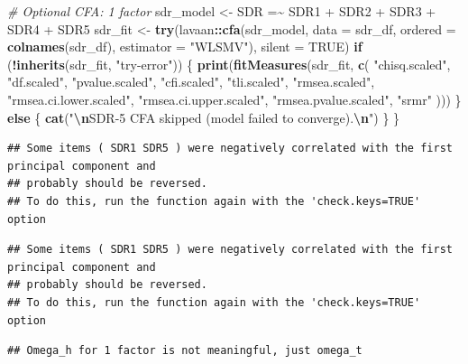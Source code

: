 \documentclass[
  10pt,
]{article}
\newenvironment{Shaded}{\begin{snugshade}}{\end{snugshade}}
\newcommand{\AttributeTok}[1]{\textcolor[rgb]{0.13,0.29,0.53}{#1}}
\newcommand{\CommentTok}[1]{\textcolor[rgb]{0.56,0.35,0.01}{\textit{#1}}}
\newcommand{\ConstantTok}[1]{\textcolor[rgb]{0.56,0.35,0.01}{#1}}
\newcommand{\ControlFlowTok}[1]{\textcolor[rgb]{0.13,0.29,0.53}{\textbf{#1}}}
\newcommand{\FunctionTok}[1]{\textcolor[rgb]{0.13,0.29,0.53}{\textbf{#1}}}
\newcommand{\NormalTok}[1]{#1}
\newcommand{\OtherTok}[1]{\textcolor[rgb]{0.56,0.35,0.01}{#1}}
\newcommand{\SpecialCharTok}[1]{\textcolor[rgb]{0.81,0.36,0.00}{\textbf{#1}}}
\newcommand{\StringTok}[1]{\textcolor[rgb]{0.31,0.60,0.02}{#1}}
\begin{document}
\begin{Shaded}
\begin{Highlighting}[]
  \CommentTok{\# Optional CFA: 1 factor}
\NormalTok{  sdr\_model }\OtherTok{\textless{}{-}} \StringTok{\textquotesingle{}SDR =\textasciitilde{} SDR1 + SDR2 + SDR3 + SDR4 + SDR5\textquotesingle{}}
\NormalTok{  sdr\_fit }\OtherTok{\textless{}{-}} \FunctionTok{try}\NormalTok{(lavaan}\SpecialCharTok{::}\FunctionTok{cfa}\NormalTok{(sdr\_model, }\AttributeTok{data =}\NormalTok{ sdr\_df, }\AttributeTok{ordered =} \FunctionTok{colnames}\NormalTok{(sdr\_df), }\AttributeTok{estimator =} \StringTok{"WLSMV"}\NormalTok{), }\AttributeTok{silent =} \ConstantTok{TRUE}\NormalTok{)}
  \ControlFlowTok{if}\NormalTok{ (}\SpecialCharTok{!}\FunctionTok{inherits}\NormalTok{(sdr\_fit, }\StringTok{"try{-}error"}\NormalTok{)) \{}
    \FunctionTok{print}\NormalTok{(}\FunctionTok{fitMeasures}\NormalTok{(sdr\_fit, }\FunctionTok{c}\NormalTok{(}
      \StringTok{"chisq.scaled"}\NormalTok{, }\StringTok{"df.scaled"}\NormalTok{, }\StringTok{"pvalue.scaled"}\NormalTok{, }\StringTok{"cfi.scaled"}\NormalTok{,}
      \StringTok{"tli.scaled"}\NormalTok{, }\StringTok{"rmsea.scaled"}\NormalTok{, }\StringTok{"rmsea.ci.lower.scaled"}\NormalTok{,}
      \StringTok{"rmsea.ci.upper.scaled"}\NormalTok{, }\StringTok{"rmsea.pvalue.scaled"}\NormalTok{, }\StringTok{"srmr"}
\NormalTok{    )))}
\NormalTok{  \} }\ControlFlowTok{else}\NormalTok{ \{}
    \FunctionTok{cat}\NormalTok{(}\StringTok{"}\SpecialCharTok{\textbackslash{}n}\StringTok{SDR{-}5 CFA skipped (model failed to converge).}\SpecialCharTok{\textbackslash{}n}\StringTok{"}\NormalTok{)}
\NormalTok{  \}}
\NormalTok{\}}
\end{Highlighting}
\end{Shaded}

\begin{verbatim}
## Some items ( SDR1 SDR5 ) were negatively correlated with the first principal component and
## probably should be reversed.
## To do this, run the function again with the 'check.keys=TRUE' option
\end{verbatim}

\begin{verbatim}
## Some items ( SDR1 SDR5 ) were negatively correlated with the first principal component and
## probably should be reversed.
## To do this, run the function again with the 'check.keys=TRUE' option
\end{verbatim}

\begin{verbatim}
## Omega_h for 1 factor is not meaningful, just omega_t
\end{verbatim}
\end{document}
